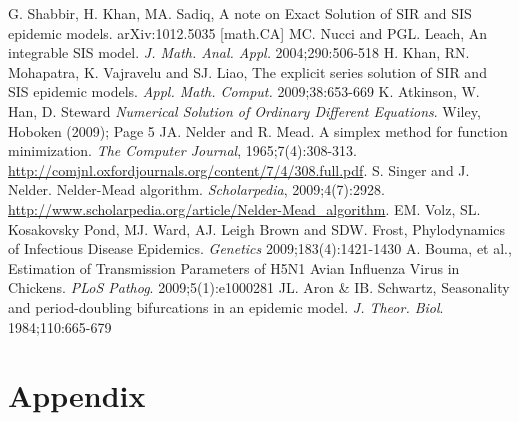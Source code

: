 \documentclass[11pt, a4paper, oneside,titlepage]{article}
\begin{document}
\begin{thebibliography}{1}
        G. Shabbir, H. Khan, MA. Sadiq, A note on Exact Solution of SIR and
        SIS epidemic models. arXiv:1012.5035 [math.CA]
        MC. Nucci and PGL. Leach, An integrable SIS model. \emph{J. Math. Anal. Appl.} 2004;290:506-518
        H. Khan, RN. Mohapatra, K. Vajravelu and SJ. Liao, The explicit
        series solution of SIR and SIS epidemic
        models. \emph{Appl. Math. Comput.} 2009;38:653-669
        K. Atkinson, W. Han, D. Steward \emph{Numerical Solution of
          Ordinary Different Equations}. Wiley, Hoboken (2009); Page 5
  JA. Nelder and R. Mead. A simplex method for function
  minimization. \emph{The Computer Journal},
  1965;7(4):308-313. \url{http://comjnl.oxfordjournals.org/content/7/4/308.full.pdf}.
  S. Singer and J. Nelder. Nelder-Mead algorithm. \emph{Scholarpedia},
  2009;4(7):2928.
  \url{http://www.scholarpedia.org/article/Nelder-Mead_algorithm}. 
  EM. Volz, SL. Kosakovsky Pond, MJ. Ward, AJ. Leigh Brown and
  SDW. Frost, Phylodynamics of Infectious Disease
  Epidemics. \emph{Genetics} 2009;183(4):1421-1430
  A. Bouma, et al., Estimation of Transmission Parameters of H5N1
  Avian Influenza Virus in Chickens. \emph{PLoS Pathog}. 2009;5(1):e1000281
  JL. Aron & IB. Schwartz, Seasonality and period-doubling
  bifurcations in an epidemic model. \emph{J. Theor. Biol}. 1984;110:665-679



\end{thebibliography}

\section*{Appendix}
\end{document}
